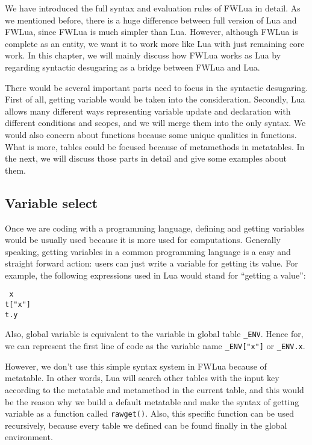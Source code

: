 \documentclass{article}
\begin{document}
We have introduced the full syntax and evaluation rules of FWLua in detail. As we mentioned before, there is a huge difference between full version of Lua and FWLua, since FWLua is much simpler than Lua. However, although FWLua is complete as an entity, we want it to work more like Lua with just remaining core work. In this chapter, we will mainly discuss how FWLua works as Lua by regarding syntactic desugaring as a bridge between FWLua and Lua. 

There would be several important parts need to focus in the syntactic desugaring. First of all, getting variable would be taken into the consideration. Secondly, Lua allows many different ways representing variable update and declaration with different conditions and scopes, and we will merge them into the only syntax. We would also concern about functions because some unique qualities in functions. What is more, tables could be focused because of metamethods in metatables. In the next, we will discuss those parts in detail and give some examples about them.

\subsection{Variable select}
Once we are coding with a programming language, defining and getting variables would be usually used because it is more used for computations. Generally speaking, getting variables in a common programming language is a easy and straight forward action: users can just write a variable for getting its value. For example, the following expressions used in Lua would stand for ``getting a value'':
\begin{flushleft}
{\tt
x\\
t["x"]\\
t.y\\
}
\end{flushleft}
Also, global variable is equivalent to the variable in global table {\tt \_ENV}. Hence for, we can represent the first line of code as the variable name {\tt \_ENV["x"]} or {\tt \_ENV.x}.

However, we don't use this simple syntax system in FWLua because of metatable. In other words, Lua will search other tables with the input key according to the metatable and metamethod in the current table, and this would be the reason why we build a default metatable and make the syntax of getting variable as a function called {\tt rawget()}. Also, this specific function can be used recursively, because every table we defined can be found finally in the global environment.
\end{document}
